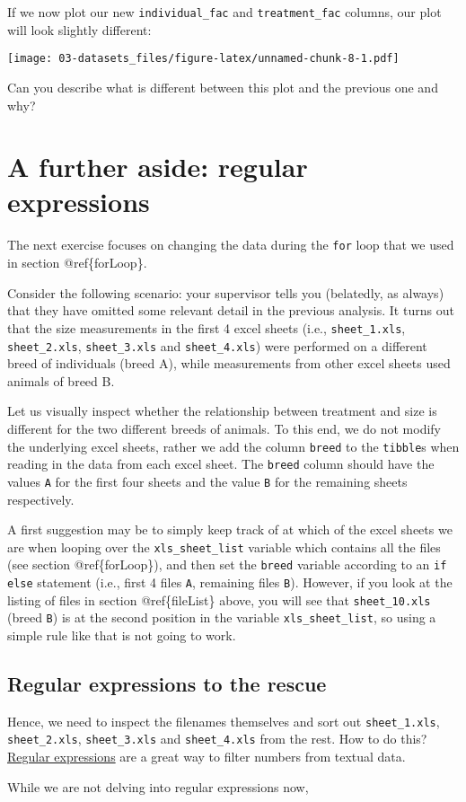\documentclass[
]{book}
\begin{document}
If we now plot our new \texttt{individual\_fac} and \texttt{treatment\_fac} columns, our plot will look slightly different:

\texttt{[image: 03-datasets\_files/figure-latex/unnamed-chunk-8-1.pdf]}

Can you describe what is different between this plot and the previous one and why?

\hypertarget{a-further-aside-regular-expressions}{%
\section{A further aside: regular expressions}\label{a-further-aside-regular-expressions}}

The next exercise focuses on changing the data during the \texttt{for} loop that we used in section @ref\{forLoop\}.

Consider the following scenario: your supervisor tells you (belatedly, as always) that they have omitted some relevant detail in the previous analysis. It turns out that the size measurements in the first 4 excel sheets (i.e., \texttt{sheet\_1.xls}, \texttt{sheet\_2.xls}, \texttt{sheet\_3.xls} and \texttt{sheet\_4.xls}) were performed on a different breed of individuals (breed A), while measurements from other excel sheets used animals of breed B.

Let us visually inspect whether the relationship between treatment and size is different for the two different breeds of animals. To this end, we do not modify the underlying excel sheets, rather we add the column \texttt{breed} to the \texttt{tibble}s when reading in the data from each excel sheet. The \texttt{breed} column should have the values \texttt{A} for the first four sheets and the value \texttt{B} for the remaining sheets respectively.

A first suggestion may be to simply keep track of at which of the excel sheets we are when looping over the \texttt{xls\_sheet\_list} variable which contains all the files (see section @ref\{forLoop\}), and then set the \texttt{breed} variable according to an \texttt{if} \texttt{else} statement (i.e., first 4 files \texttt{A}, remaining files \texttt{B}). However, if you look at the listing of files in section @ref\{fileList\} above, you will see that \texttt{sheet\_10.xls} (breed \texttt{B}) is at the second position in the variable \texttt{xls\_sheet\_list}, so using a simple rule like that is not going to work.

\hypertarget{regular-expressions-to-the-rescue}{%
\subsection{Regular expressions to the rescue}\label{regular-expressions-to-the-rescue}}

Hence, we need to inspect the filenames themselves and sort out \texttt{sheet\_1.xls}, \texttt{sheet\_2.xls}, \texttt{sheet\_3.xls} and \texttt{sheet\_4.xls} from the rest. How to do this? \href{https://stat.ethz.ch/R-manual/R-patched/library/base/html/regex.html}{Regular expressions} are a great way to filter numbers from textual data.

While we are not delving into regular expressions now,

  
\end{document}
